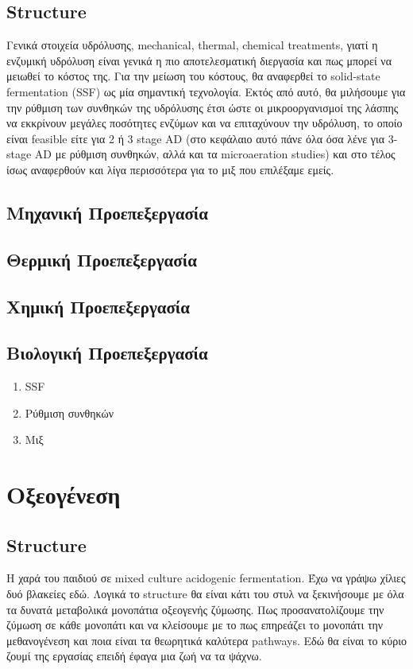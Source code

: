 \documentclass[11pt]{report}
\begin{document}
\section{Structure}
\label{sec:orge2259ff}
Γενικά στοιχεία υδρόλυσης, mechanical, thermal, chemical treatments, γιατί η ενζυμική υδρόλυση είναι γενικά η πιο αποτελεσματική διεργασία και πως μπορεί να μειωθεί το κόστος της. Για την μείωση του κόστους, θα αναφερθεί το solid-state fermentation (SSF) ως μία σημαντική τεχνολογία. Εκτός από αυτό, θα μιλήσουμε για την ρύθμιση των συνθηκών της υδρόλυσης έτσι ώστε οι μικροοργανισμοί της λάσπης να εκκρίνουν μεγάλες ποσότητες ενζύμων και να επιταχύνουν την υδρόλυση, το οποίο είναι feasible είτε για 2 ή 3 stage AD (στο κεφάλαιο αυτό πάνε όλα όσα λένε για 3-stage AD με ρύθμιση συνθηκών, αλλά και τα microaeration studies) και στο τέλος ίσως αναφερθούν και λίγα περισσότερα για το μιξ που επιλέξαμε εμείς.

\section{Μηχανική Προεπεξεργασία}
\label{sec:orgff90fdb}

\section{Θερμική Προεπεξεργασία}
\label{sec:org1085d8a}

\section{Χημική Προεπεξεργασία}
\label{sec:orgb9f4908}

\section{Βιολογική Προεπεξεργασία}
\label{sec:org25e3ea1}
\begin{enumerate}
\item SSF
\label{sec:orge4cc0cd}
\item Ρύθμιση συνθηκών
\label{sec:org77ef360}
\item Μιξ
\label{sec:orge0e3ec2}
\end{enumerate}

\chapter{Οξεογένεση}
\label{sec:orgb52c7d8}
\label{sec:acidogenesis}

\section{Structure}
\label{sec:org62f1ebe}
Η χαρά του παιδιού σε mixed culture acidogenic fermentation. Έχω να γράψω χίλιες δυό βλακείες εδώ. Λογικά το structure θα είναι κάτι του στυλ να ξεκινήσουμε με όλα τα δυνατά μεταβολικά μονοπάτια οξεογενής ζύμωσης. Πως προσανατολίζουμε την ζύμωση σε κάθε μονοπάτι και να κλείσουμε με το πως επηρεάζει το μονοπάτι την μεθανογένεση και ποια είναι τα θεωρητικά καλύτερα pathways. Εδώ θα είναι το κύριο ζουμί της εργασίας επειδή έφαγα μια ζωή να τα ψάχνω.
\end{document}
